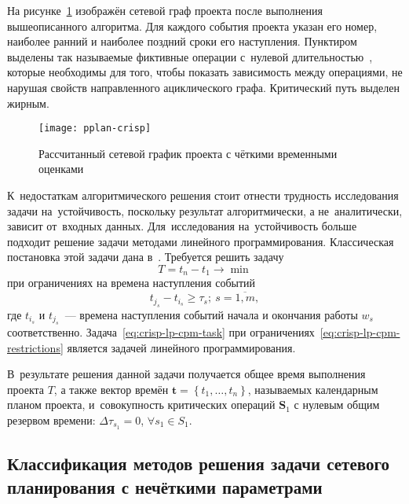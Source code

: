 На рисунке~\ref{fig:pplan-crisp} изображён сетевой граф проекта после выполнения вышеописанного алгоритма. Для каждого события проекта указан его номер, наиболее ранний и наиболее поздний сроки его наступления. Пунктиром выделены так называемые фиктивные операции с~нулевой длительностью~\cite{Eddous, Taha_Operation_Research}, которые необходимы для того, чтобы показать зависимость между операциями, не нарушая свойств направленного ациклического графа. Критический путь выделен жирным.
\begin{figure}[h!]
  \centering
  {
    \texttt{[image: pplan-crisp]}
    \caption{Рассчитанный сетевой график проекта с чёткими временными оценками}
    \label{fig:pplan-crisp}
  }
\end{figure}

К~недостаткам алгоритмического решения стоит отнести трудность исследования задачи на~устойчивость, поскольку результат алгоритмически, а не~аналитически, зависит от~входных данных. Для~исследования на~устойчивость больше подходит решение задачи методами линейного программирования. Классическая постановка этой задачи дана в~\cite{Kosorukov_Mischenko}. Требуется решить задачу
\begin{equation}
\label{eq:crisp-lp-cpm-task}
  T=t_n-t_1 \to \min
\end{equation}
при ограничениях на времена наступления событий
\begin{equation}
\label{eq:crisp-lp-cpm-restrictions}
  t_{j_s}-t_{i_s}\geqslant \tau_s;\ s=\overline{1,m},
\end{equation}
где $t_{i_s}$ и $t_{j_s}$~--- времена наступления событий начала и окончания работы $w_s$ соответственно. Задача~\eqref{eq:crisp-lp-cpm-task} при ограничениях~\eqref{eq:crisp-lp-cpm-restrictions} является задачей линейного программирования.

В~результате решения данной задачи получается общее время выполнения проекта $T$, а также вектор времён $\mathbf{t}=\left\{ t_1, \ldots, t_n \right\}$, называемых календарным планом проекта, и~совокупность критических операций $\mathbf{S}_1$ с нулевым общим резервом времени: $\Delta \tau_{s_1}=0$, $\forall s_1 \in S_1$.

\subsection{Классификация методов решения задачи сетевого планирования с нечёткими параметрами}

